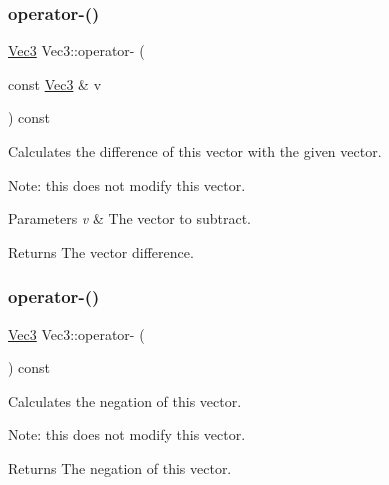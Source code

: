 \subsubsection{\texorpdfstring{operator-\/()}{operator-()}\hspace{0.1cm}{\footnotesize\ttfamily [2/4]}}
{\footnotesize\ttfamily \hyperlink{classVec3}{Vec3} Vec3\+::operator-\/ (\begin{DoxyParamCaption}\item[{const \hyperlink{classVec3}{Vec3} \&}]{v }\end{DoxyParamCaption}) const\hspace{0.3cm}{\ttfamily [inline]}}

Calculates the difference of this vector with the given vector.

Note\+: this does not modify this vector.


\begin{DoxyParams}{Parameters}
{\em v} & The vector to subtract. \\
\hline
\end{DoxyParams}
\begin{DoxyReturn}{Returns}
The vector difference. 
\end{DoxyReturn}
\mbox{\label{classVec3_ab05753413af282b8cbd879c334c8e5aa}} 
\subsubsection{\texorpdfstring{operator-\/()}{operator-()}\hspace{0.1cm}{\footnotesize\ttfamily [3/4]}}
{\footnotesize\ttfamily \hyperlink{classVec3}{Vec3} Vec3\+::operator-\/ (\begin{DoxyParamCaption}{ }\end{DoxyParamCaption}) const\hspace{0.3cm}{\ttfamily [inline]}}

Calculates the negation of this vector.

Note\+: this does not modify this vector.

\begin{DoxyReturn}{Returns}
The negation of this vector. 
\end{DoxyReturn}
\mbox{\label{classVec3_ab05753413af282b8cbd879c334c8e5aa}} 
